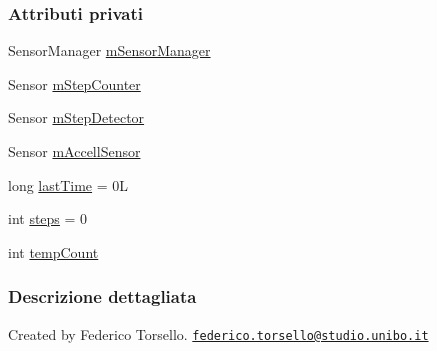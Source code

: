 \subsubsection*{Attributi privati}
\begin{DoxyCompactItemize}
\item 
Sensor\+Manager \hyperlink{classit_1_1unibo_1_1torsello_1_1bluetoothpositioning_1_1fragment_1_1oldFragment_1_1CountPassFragment_a24e4aafb3d377f25aa09024e196d4d8d_a24e4aafb3d377f25aa09024e196d4d8d}{m\+Sensor\+Manager}
\item 
Sensor \hyperlink{classit_1_1unibo_1_1torsello_1_1bluetoothpositioning_1_1fragment_1_1oldFragment_1_1CountPassFragment_afd05ecb723e92fbb3d27bf4978e256bc_afd05ecb723e92fbb3d27bf4978e256bc}{m\+Step\+Counter}
\item 
Sensor \hyperlink{classit_1_1unibo_1_1torsello_1_1bluetoothpositioning_1_1fragment_1_1oldFragment_1_1CountPassFragment_a83913867971bc949eeff6aa7780cbff2_a83913867971bc949eeff6aa7780cbff2}{m\+Step\+Detector}
\item 
Sensor \hyperlink{classit_1_1unibo_1_1torsello_1_1bluetoothpositioning_1_1fragment_1_1oldFragment_1_1CountPassFragment_a5ceea3320c4813a465731b5f8cd36ce2_a5ceea3320c4813a465731b5f8cd36ce2}{m\+Accell\+Sensor}
\item 
long \hyperlink{classit_1_1unibo_1_1torsello_1_1bluetoothpositioning_1_1fragment_1_1oldFragment_1_1CountPassFragment_a0b2cb1d00e5c90bf8edc6997aee6fb2e_a0b2cb1d00e5c90bf8edc6997aee6fb2e}{last\+Time} = 0L
\item 
int \hyperlink{classit_1_1unibo_1_1torsello_1_1bluetoothpositioning_1_1fragment_1_1oldFragment_1_1CountPassFragment_a61757f08791ab239bac96f4a086b8d44_a61757f08791ab239bac96f4a086b8d44}{steps} = 0
\item 
int \hyperlink{classit_1_1unibo_1_1torsello_1_1bluetoothpositioning_1_1fragment_1_1oldFragment_1_1CountPassFragment_a2587f4727a7290c2252e88ebfd10a56e_a2587f4727a7290c2252e88ebfd10a56e}{temp\+Count}
\end{DoxyCompactItemize}


\subsubsection{Descrizione dettagliata}
Created by Federico Torsello. \href{mailto:federico.torsello@studio.unibo.it}{\tt federico.\+torsello@studio.\+unibo.\+it} 

